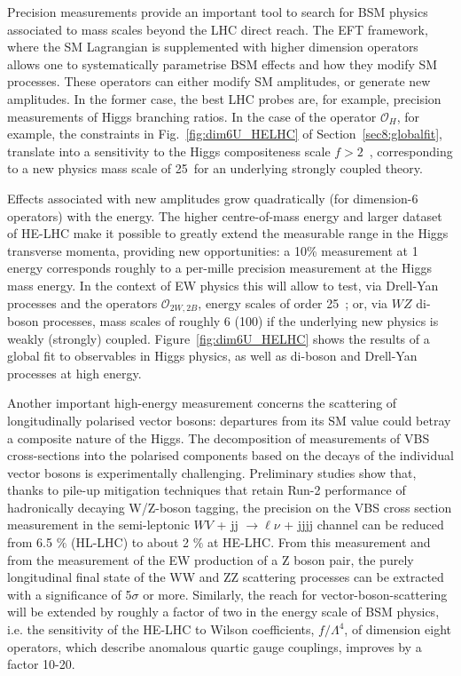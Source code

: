 \documentclass[../report.tex]{subfiles}
\begin{document}
Precision measurements provide an important tool to search for BSM physics associated to mass scales beyond the LHC direct reach. The EFT framework, where the SM Lagrangian is supplemented with higher dimension operators %
allows one to systematically parametrise BSM effects and how they modify SM processes. These operators can either modify SM amplitudes, or generate new amplitudes. In the former case, the best LHC probes are, for example, precision measurements of Higgs branching ratios. In the case of the operator $\mathcal{O}_H$, for example, the constraints in Fig.~\ref{fig:dim6U_HELHC} of Section~\ref{sec8:globalfit}, translate into a sensitivity to the Higgs compositeness scale $f>2$~\UTeV, corresponding to a new physics mass scale of 25~\UTeV for an underlying strongly coupled theory.

Effects associated with  new amplitudes grow quadratically (for dimension-6 operators) with the energy. The higher centre-of-mass energy and larger dataset of HE-LHC make it possible to greatly extend the measurable range in the Higgs transverse momenta, providing new opportunities: a 10\% measurement  at 1 \UTeV energy corresponds roughly to a per-mille  precision measurement at the Higgs mass energy. 
In the context of EW physics this will allow  to test, via Drell-Yan processes and  the operators $\mathcal{O}_{2W,2B}$, energy scales of order 25~\UTeV; or, via $WZ$ di-boson processes, mass scales of roughly 6 (100) \UTeV if the underlying new physics is weakly (strongly) coupled.
Figure~\ref{fig:dim6U_HELHC} shows the results of a global fit  to observables in Higgs physics, as well as di-boson and Drell-Yan processes at high energy. 

Another important high-energy measurement concerns the scattering of longitudinally polarised vector bosons: departures from its SM value could betray a composite nature of the Higgs.
The decomposition of measurements of VBS cross-sections into the polarised components based on the decays of the individual vector bosons is experimentally challenging. Preliminary studies show that, thanks to pile-up mitigation techniques that retain Run-2 performance of hadronically decaying W/Z-boson tagging, the precision on the VBS cross section measurement in the semi-leptonic $W V$ + jj $\to \ell\nu$ + jjjj channel can be reduced from 6.5 $\%$ (HL-LHC) to about 2 $\%$ at HE-LHC. From this measurement and from the measurement of the EW production of a Z boson pair, the purely longitudinal final state of the WW and ZZ scattering processes can be extracted with a significance of 5$\sigma$ or more. Similarly, the reach for vector-boson-scattering will be extended by roughly a factor of two in the energy scale of BSM physics, i.e. the sensitivity of the HE-LHC to Wilson coefficients, $f/\Lambda^4$, of dimension eight operators, which describe anomalous quartic gauge couplings, improves by a factor 10-20.
\end{document}
